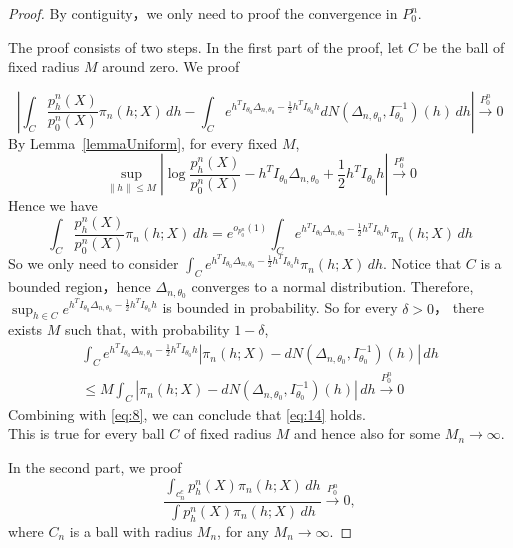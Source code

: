 




\begin{proof}
    By contiguity，we only need to proof the convergence in $P_0^n$.

The proof consists of two steps. In the first part of the proof, let $C$ be the ball of fixed radius $M$ around zero. We proof

\begin{equation}\label{eq:14}
    \left|\int_C \frac{p^n_h(X)}{p^n_0(X)}\pi_n (h;X) \, dh-\int_C e^{h^TI_{\theta_0}\Delta_{n,\theta_0}-\frac{1}{2}h^TI_{\theta_0}h}dN(\Delta_{n,\theta_0},I_{\theta_0}^{-1})(h)\, dh\right|
 \xrightarrow{P^n_0}0
\end{equation}
By Lemma~\ref{lemmaUniform}, for every fixed $M$,
\begin{equation}
    \sup_{\|h\|\leq M}|\log \frac{p_h^n(X)}{p_0^n(X)}-h^TI_{\theta_0}\Delta_{n,\theta_0}+\frac{1}{2}h^TI_{\theta_0}h|\xrightarrow{P_0^n}0 
\end{equation}
Hence we have
\begin{equation}\label{eq:8}
    \int_C \frac{p_h^n(X)}{p_0^n(X)}\pi_n (h;X) \, dh=e^{o_{p^n_0}(1)}\int_C e^{h^TI_{\theta_0}\Delta_{n,\theta_0}-\frac{1}{2}h^TI_{\theta_0}h}\pi_n (h;X) \, dh
\end{equation}
So we only need to consider $\int_C e^{h^TI_{\theta_0}\Delta_{n,\theta_0}-\frac{1}{2}h^TI_{\theta_0}h}\pi_n (h;X) \, dh$. Notice that $C$ is a bounded region，hence $\Delta_{n,\theta_0}$ converges to a normal distribution. Therefore, $\sup_{h\in C}e^{h^TI_{\theta_0}\Delta_{n,\theta_0}-\frac{1}{2}h^TI_{\theta_0}h}$ is bounded in probability. So for every $\delta>0$， there exists $M$ such that, with probability $1-\delta$,
\begin{equation}
\begin{aligned}
    \int_C e^{h^TI_{\theta_0}\Delta_{n,\theta_0}-\frac{1}{2}h^TI_{\theta_0}h}|\pi_n (h;X)-dN(\Delta_{n,\theta_0},I_{\theta_0}^{-1})(h)|\, dh
\\
\leq M\int_C |\pi_n(h;X)-dN(\Delta_{n,\theta_0},I_{\theta_0}^{-1})(h)|\, dh\xrightarrow{P^n_0}0
\end{aligned}
\end{equation}
Combining with \eqref{eq:8}, we can conclude that \eqref{eq:14} holds. \\

This is true for every ball $C$ of fixed radius $M$ and hence also for some $M_n\to \infty$.

In the second part, we proof
\begin{equation}\label{eq:4}
    \frac{\int_{c_n^c}p_h^n(X)\pi_n(h;X)\, dh}{\int p_h^n(X)\pi_n(h;X)\, dh}\xrightarrow{P_0^n}0,
\end{equation}
where $C_n$ is a ball with radius $M_n$, for any $M_n\to \infty$.
    

\end{proof}
